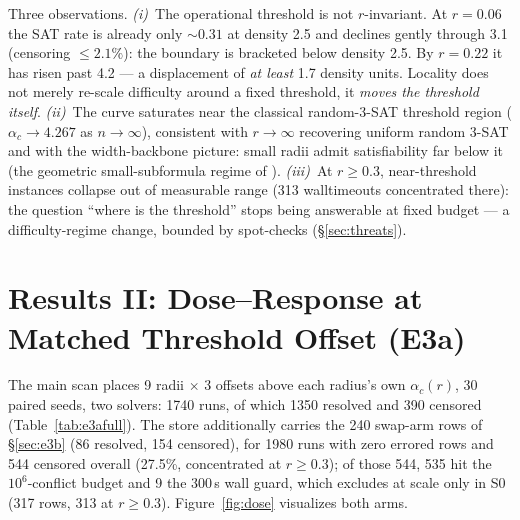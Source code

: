 \documentclass[manuscript, screen, review]{jair}
\newcommand{\ac}[1]{\ensuremath{\alpha_c(#1)}}
\begin{document}
Three observations. \emph{(i)}~The operational threshold is not
$r$-invariant. At $r=0.06$ the SAT rate is already only ${\sim}0.31$ at
density 2.5 and declines gently through 3.1 (censoring $\le2.1\%$): the
boundary is bracketed below density 2.5. By $r=0.22$ it has risen past 4.2
--- a displacement of \emph{at least} 1.7 density units. Locality does not
merely re-scale difficulty around a fixed threshold, it \emph{moves the
threshold itself}. \emph{(ii)}~The curve saturates near the classical
random-3-SAT threshold region \parencite{mezard2002} ($\alpha_c \to 4.267$ as $n\to\infty$),
consistent with $r\to\infty$ recovering uniform random 3-SAT and with the
width-backbone picture: small radii admit satisfiability far below it (the
geometric small-subformula regime of \parencite{blasius2022}). \emph{(iii)}~At $r\ge0.3$,
near-threshold instances collapse out of measurable range (313 walltimeouts
concentrated there): the question ``where is the threshold'' stops being
answerable at fixed budget --- a difficulty-regime change, bounded by
spot-checks (\S\ref{sec:threats}).

\section{Results II: Dose--Response at Matched Threshold Offset (E3a)}
\label{sec:e3a}

The main scan places 9 radii $\times$ 3 offsets above each radius's own
$\ac{r}$, 30 paired seeds, two solvers: 1740 runs, of which 1350 resolved
and 390 censored (Table~\ref{tab:e3afull}). The store additionally carries
the 240 swap-arm rows of \S\ref{sec:e3b} (86 resolved, 154 censored), for
1980 runs with zero errored rows and 544 censored overall (27.5\%,
concentrated at $r\ge0.3$); of those 544, 535 hit the $10^6$-conflict
budget and 9 the $300$\,s wall guard, which excludes at scale only in S0
(317 rows, 313 at $r\ge0.3$). Figure~\ref{fig:dose}
visualizes both arms.
\end{document}

